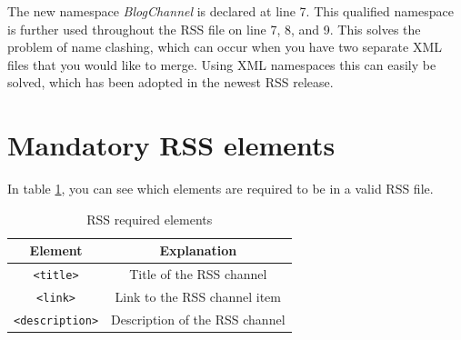 The new namespace \textit{BlogChannel} is declared at line 7. This qualified namespace is further used throughout the RSS file on line 7, 8, and 9. This solves the problem of name clashing, which can occur when you have two separate XML files that you would like to merge. Using XML namespaces this can easily be solved, which has been adopted in the newest RSS release.

\section{Mandatory RSS elements}
\label{sec:mandatory-rss-elements}
In table \ref{table:mandatory-rss-elements}, you can see which elements are required to be in a valid RSS file.

\begin{table}[ht]
\begin{tabular}{c | c}
Element & Explanation \\ \hline
\texttt{<title>} & Title of the RSS channel \\ \hline
\texttt{<link>} & Link to the RSS channel item \\ \hline
\texttt{<description>} & Description of the RSS channel \\ \hline 
\end{tabular}
\caption{RSS required elements}
\label{table:mandatory-rss-elements}
\end{table}